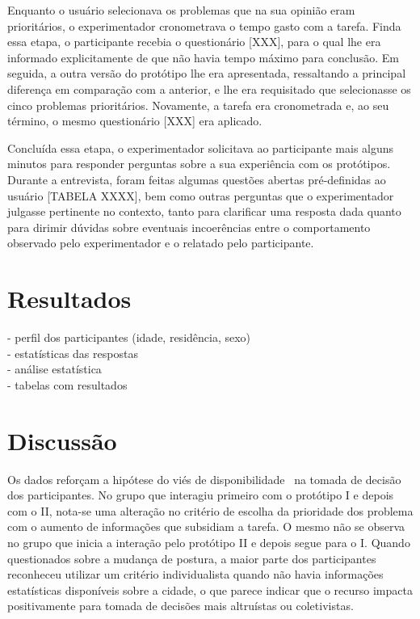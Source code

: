 \documentclass{sigchi}
\begin{document}
Enquanto o usuário selecionava os problemas que na sua opinião eram prioritários, o experimentador cronometrava o tempo gasto com a tarefa. Finda essa etapa, o participante recebia o questionário [XXX], para o qual lhe era informado explicitamente de que não havia tempo máximo para conclusão. Em seguida, a outra versão do protótipo lhe era apresentada, ressaltando a principal diferença em comparação com a anterior, e lhe era requisitado que selecionasse os cinco problemas prioritários. Novamente, a tarefa era cronometrada e, ao seu término, o mesmo questionário [XXX] era aplicado.

Concluída essa etapa, o experimentador solicitava ao participante mais alguns minutos para responder perguntas sobre a sua experiência com os protótipos. Durante a entrevista, foram feitas algumas questões abertas pré-definidas ao usuário [TABELA XXXX], bem como outras perguntas que o experimentador julgasse pertinente no contexto, tanto para clarificar uma resposta dada quanto para dirimir dúvidas sobre eventuais incoerências entre o comportamento observado pelo experimentador e o relatado pelo participante.





\section{Resultados}
- perfil dos participantes (idade, residência, sexo)\\
- estatísticas das respostas\\
- análise estatística\\
- tabelas com resultados\\


\section{Discussão}
Os dados reforçam a hipótese do viés de disponibilidade~\cite{tversky:1973} na tomada de decisão dos participantes. No grupo que interagiu primeiro com o protótipo I e depois com o II, nota-se uma alteração no critério de escolha da prioridade dos problema com o aumento de informações que subsidiam a tarefa. O mesmo não se observa no grupo que inicia a interação pelo protótipo II e depois segue para o I. Quando questionados sobre a mudança de postura, a maior parte dos participantes reconheceu utilizar um critério individualista quando não havia informações estatísticas disponíveis sobre a cidade, o que parece indicar que o recurso impacta positivamente para tomada de decisões mais altruístas ou coletivistas.
\end{document}
